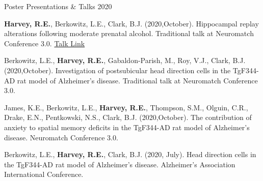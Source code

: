 

\begin{cventries}
\cventry
    {Poster Presentations \& Talks} %
    {} %
    {} %
    {2020} %
    {
      \begin{cvitems} %
        \setlength\itemsep{0.35em}
        \item {\textbf{Harvey, R.E.}, Berkowitz, L.E., Clark, B.J. (2020,October). Hippocampal replay alterations following moderate prenatal alcohol. Traditional talk at Neuromatch Conference 3.0. \href{https://www.youtube.com/watch?v=YlsuJasxjjg&t=5s&ab_channel=NeuromatchConference}{Talk Link}}
        \item {Berkowitz, L.E., \textbf{Harvey, R.E.}, Gabaldon-Parish, M., Roy, V.J., Clark, B.J. (2020,October). Investigation of postsubicular head direction cells in the TgF344-AD rat model of Alzheimer’s disease. Traditional talk at Neuromatch Conference 3.0.}
        \item {James, K.E., Berkowitz, L.E., \textbf{Harvey, R.E.}, Thompson, S.M., Olguin, C.R., Drake, E.N., Pentkowski, N.S., Clark, B.J. (2020,October). The contribution of anxiety to spatial memory deficits in the TgF344-AD rat model of Alzheimer’s disease. Neuromatch Conference 3.0.}
        \item {Berkowitz, L.E., \textbf{Harvey, R.E.}, Clark, B.J. (2020, July). Head direction cells in the TgF344-AD rat model of Alzheimer's disease. Alzheimer's Association International Conference.}      
      \end{cvitems}
    }
\end{cventries}
    
